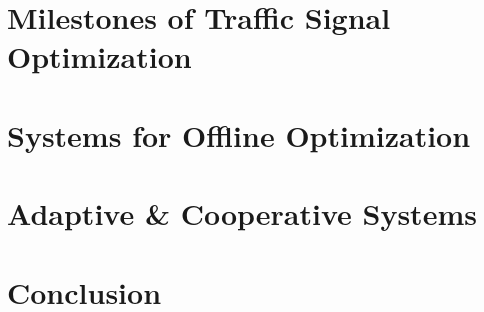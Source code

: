 \documentclass [a4paper, 10pt]{article}
\begin{document}
%

\section{Milestones of Traffic Signal Optimization}


\section{Systems for Offline Optimization}


\section{Adaptive \& Cooperative Systems}


%

\section{Conclusion}




\end{document}
